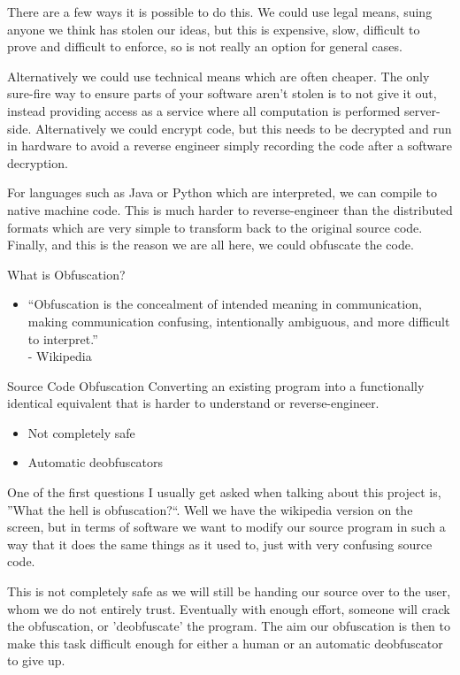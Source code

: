 There are a few ways it is possible to do this. We could use legal means, suing anyone we think has stolen our ideas, but this is expensive, slow, difficult
to prove and difficult to enforce, so is not really an option for general cases.

Alternatively we could use technical means which are often cheaper. The only sure-fire way to ensure parts of your software aren't stolen is to not give it out,
instead providing access as a service where all computation is performed server-side. Alternatively we could encrypt code, but this needs to be decrypted and run
in hardware to avoid a reverse engineer simply recording the code after a software decryption.

For languages such as Java or Python which are interpreted, we can compile to native machine code. This is much harder to reverse-engineer than the distributed formats
which are very simple to transform back to the original source code. Finally, and this is the reason we are all here, we could obfuscate the code.

\begin{frame}{What is Obfuscation?}
\begin{itemize}
\item ``Obfuscation is the concealment of intended meaning in communication, making communication confusing, intentionally ambiguous, and more difficult
      to interpret.'' \\ - Wikipedia
\end{itemize}
\begin{block}{Source Code Obfuscation}
Converting an existing program into a functionally identical equivalent that is harder to understand or reverse-engineer.
\end{block}
\begin{itemize}
\item Not completely safe
\item Automatic deobfuscators
\end{itemize}
\end{frame}

One of the first questions I usually get asked when talking about this project is, ''What the hell is obfuscation?``. Well we have the wikipedia version on the screen,
but in terms of software we want to modify our source program in such a way that it does the same things as it used to, just with very confusing source code.

This is not completely safe as we will still be handing our source over to the user, whom we do not entirely trust. Eventually with enough effort, someone will crack
the obfuscation, or 'deobfuscate' the program. The aim our obfuscation is then to make this task difficult enough for either a human or an automatic deobfuscator to
give up.

